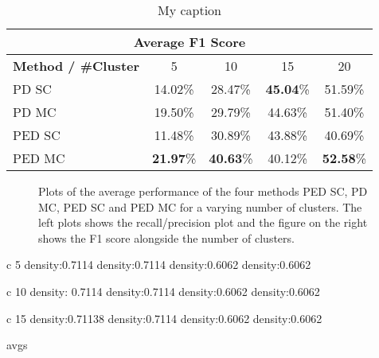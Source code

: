\begin{table}[H]
\centering
\begin{tabular}{|l|c|c|c|c|}
\hline
\multicolumn{5}{|c|}{Average F1 Score} \\ \hline
\textbf{Method / \#Cluster} & 5 & 10 & 15 & 20 \\ \hline
PD SC & 14.02\% & 28.47\% & \textbf{45.04}\% & 51.59\% \\ \hline
PD MC & 19.50\% & 29.79\% & 44.63\% & 51.40\% \\ \hline
PED SC & 11.48\% & 30.89\% & 43.88\% & 40.69\% \\ \hline
PED MC & \textbf{21.97}\% & \textbf{40.63}\% & 40.12\% & \textbf{52.58}\% \\ \hline
\end{tabular}
\caption[Chair 3 Cast: Average F1 Scores]{My caption}
\label{tab:chair_3_cast_avg_f1}
\end{table}


\begin{figure}[H]
\begin{center}

\end{center}
\caption[Chair 3 Cast avg statistic plots]{Plots of the average performance of the four methods PED SC, PD MC, PED SC and PED MC for a varying number of clusters. The left plots shows the recall/precision plot and the figure on the right shows the F1 score alongside the number of clusters.}
\label{fig:chair_3_cast_plot_avg_stat}
\end{figure}


c 5
density:0.7114
density:0.7114
density:0.6062
density:0.6062

c 10
density: 0.7114
density:0.7114
density:0.6062
density:0.6062

c 15
density:0.71138
density:0.7114
density:0.6062
density:0.6062


avgs











